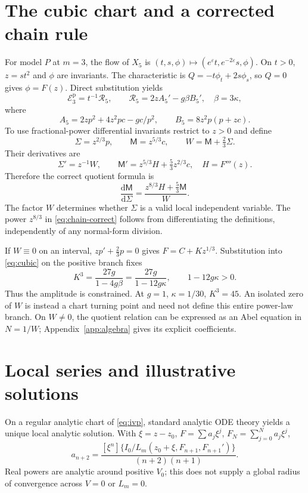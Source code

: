 \documentclass[11pt,a4paper,oneside]{report}
\numberwithin{equation}{chapter}
\newcommand{\E}{\mathcal E}
\newcommand{\R}{\mathcal R}
\newcommand{\dd}{\mathrm d}
\begin{document}
\section{The cubic chart and a corrected chain rule}\label{sec:cubic}
For model $P$ at $m=3$, the flow of $X_5$ is
$(t,s,\phi)\mapsto(e^\varepsilon t,e^{-2\varepsilon}s,\phi)$.
On $t>0$, $z=st^2$ and $\phi$ are invariants. The characteristic is
$Q=-t\phi_t+2s\phi_s$, so $Q=0$ gives $\phi=F(z)$.
Direct substitution yields
\begin{equation}\label{eq:cubic}
\E_3^{\mathrm p}=t^{-1}\R_5,\qquad
\R_5=2zA_5'-g\beta B_5',\quad\beta=3\kappa,
\end{equation}
where
\begin{equation}
A_5=2zp^2+4z^2pc-gc/p^2,\qquad
B_5=8z^2p(p+zc).
\end{equation}
To use fractional-power differential invariants restrict to $z>0$ and define
\begin{equation}
\Sigma=z^{2/3}p,\qquad \mathsf M=z^{5/3}c,
\qquad W=\mathsf M+\tfrac23\Sigma.
\end{equation}
Their derivatives are
\begin{equation}
\Sigma'=z^{-1}W,\qquad
\mathsf M'=z^{5/3}H+\tfrac53z^{2/3}c,
\quad H=F'''(z).
\end{equation}
Therefore the correct quotient formula is
\begin{equation}\boxed{\displaystyle
\frac{\dd\mathsf M}{\dd\Sigma}
=\frac{z^{8/3}H+\tfrac53\mathsf M}{W}.}\label{eq:chain-correct}
\end{equation}
The factor $W$ determines whether $\Sigma$ is a valid local independent variable. The power $z^{8/3}$ in \eqref{eq:chain-correct} follows from differentiating the definitions, independently of any normal-form division.

If $W\equiv0$ on an interval, $zp'+\tfrac23p=0$ gives
$F=C+Kz^{1/3}$. Substitution into \eqref{eq:cubic} on the positive branch fixes
\begin{equation}\label{eq:power}
K^3=\frac{27g}{1-4g\beta}=\frac{27g}{1-12g\kappa},\qquad 1-12g\kappa>0.
\end{equation}
Thus the amplitude is constrained. At $g=1$, $\kappa=1/30$, $K^3=45$. An isolated zero of $W$ is instead a chart turning point and need not define this entire power-law branch. On $W\ne0$, the quotient relation can be expressed as an Abel equation in $N=1/W$; Appendix~\ref{app:algebra} gives its explicit coefficients.

\section{Local series and illustrative solutions}
On a regular analytic chart of \eqref{eq:ivp}, standard analytic ODE theory \cite{teschl2012} yields a unique local analytic solution. With $\xi=z-z_0$, $F=\sum a_j\xi^j$, $F_N=\sum_{j=0}^Na_j\xi^j$,
\begin{equation}\label{eq:recurrence}
a_{n+2}=\frac{[\xi^n]\{I_0/L_m(z_0+\xi,F_{n+1},F_{n+1}')\}}{(n+2)(n+1)}.
\end{equation}
Real powers are analytic around positive $V_0$; this does not supply a global radius of convergence across $V=0$ or $L_m=0$.
\end{document}
